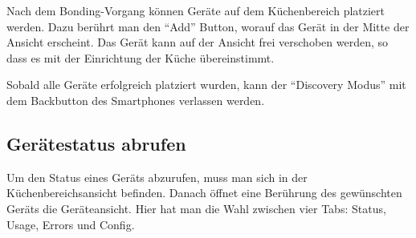 Nach dem Bonding-Vorgang können Geräte auf dem Küchenbereich platziert werden. Dazu berührt man den \enquote{Add} Button, worauf das Gerät in der Mitte der Ansicht erscheint. Das Gerät kann auf der Ansicht frei verschoben werden, so dass es mit der Einrichtung der Küche übereinstimmt. 

Sobald alle Geräte erfolgreich platziert wurden, kann der \enquote{Discovery Modus} mit dem Backbutton des Smartphones verlassen werden.

\WFclear
\subsection{Gerätestatus abrufen}
Um den Status eines Geräts abzurufen, muss man sich in der Küchenbereichsansicht befinden. Danach öffnet eine Berührung des gewünschten Geräts die Geräteansicht. Hier hat man die Wahl zwischen vier Tabs: Status, Usage, Errors und Config.

